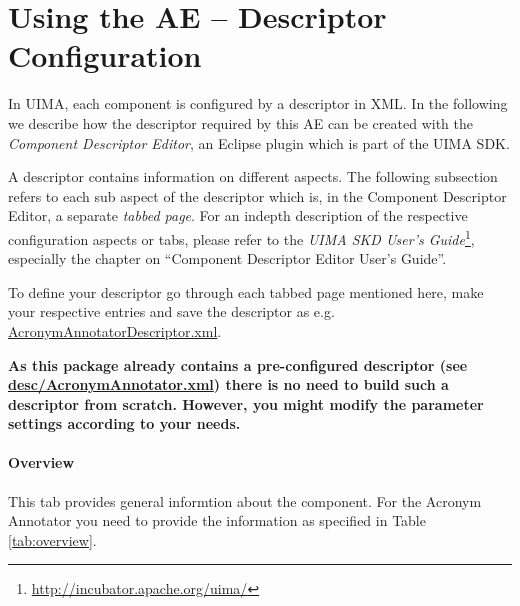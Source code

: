 \documentclass[11pt,a4paper,halfparskip]{scrartcl}
\begin{document}




\section{Using the AE -- Descriptor Configuration}

In UIMA, each component is configured by a descriptor in XML. In the
following we describe how the descriptor required by this AE can be
created with the \emph{Component Descriptor Editor}, an Eclipse plugin
which is part of the UIMA SDK. 

A descriptor contains information on different aspects. The following
subsection refers to each sub aspect of the descriptor which is, in
the Component Descriptor Editor, a separate \emph{tabbed page}. For an
indepth description of the respective configuration aspects or tabs,
please refer to the \emph{UIMA SKD User's
  Guide}\footnote{\url{http://incubator.apache.org/uima/}}, especially
the chapter on ``Component Descriptor Editor User's Guide''.

To define your descriptor go through each tabbed page mentioned
here, make your respective entries and save
the descriptor as e.g. \url{AcronymAnnotatorDescriptor.xml}.

\textbf{As this package already contains a pre-configured descriptor
  (see \url{desc/AcronymAnnotator.xml}) there is no need to build such
  a descriptor from scratch. However, you might modify the parameter
  settings according to your needs.}

\paragraph{Overview}
This tab provides general informtion about the component. For the
Acronym Annotator you need to provide the information as specified in
Table \ref{tab:overview}.
\end{document}
